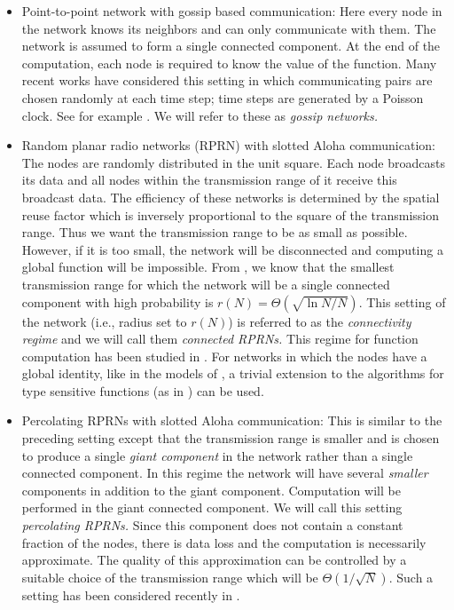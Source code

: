 \documentclass[10pt,twosided,a4paper,draft,onecolumn]{article}
\begin{document}
\begin{itemize}
\item Point-to-point network with gossip based communication: Here
  every node in the network knows its neighbors and can only
  communicate with them. The network is assumed to form a single
  connected component. At the end of the computation, each node is
  required to know the value of the function. Many recent works have
  considered this setting in which communicating pairs are chosen
  randomly at each time step; time steps are generated by a Poisson
  clock. See for example \cite{Ayaso08,Boyd05,Mosk-Aoyama06}. We will
  refer to these as \emph{gossip networks.} 
\item Random planar radio networks (RPRN) with slotted Aloha
  communication:  The nodes are randomly distributed in the unit
  square. Each node broadcasts its data and all nodes within the
  transmission range of it receive this broadcast data. The efficiency
  of these networks is determined by the spatial reuse factor which is
  inversely proportional to the square of the transmission range. Thus
  we want the transmission range to be as small as possible. However,
  if it is too small, the network will be disconnected and computing a
  global function will be impossible. From \cite{Gupta00}, we know that the
  smallest transmission range for which the network will be a single
  connected component with high probability is $r(N) = \Theta
  \left(\sqrt{\ln N/N}\right).$ This setting of the network (i.e.,
  radius set to $r(N)$) is referred to as the \emph{connectivity
    regime} and we will call them \emph{connected RPRNs.}  This regime
  for function computation has been studied in \cite{Kamath08,
    Giridhar06, Dutta08}. For networks in which the nodes have a
  global identity, like in the models of \cite{Giridhar06}, a trivial
  extension to the algorithms for type sensitive functions (as in
  \cite{Giridhar05}) can be used.

\item Percolating RPRNs with slotted Aloha communication: This is
  similar to the preceding setting except that the transmission range
  is smaller and is chosen to produce a single \emph{giant component}
  in the network rather than a single connected component. In this
  regime the network will have several \emph{smaller} components in
  addition to the giant component. Computation will be performed in
  the giant connected component. We will call this setting
  \emph{percolating RPRNs.} Since this component does not contain a
  constant fraction of the nodes, there is data loss and the
  computation is necessarily approximate. The quality of this
  approximation can be controlled by a suitable choice of the
  transmission range which will be $\Theta \left(1/\sqrt{N} \right).$
  Such a setting has been considered recently in \cite{Iyer11}.
\end{itemize}
\end{document}
